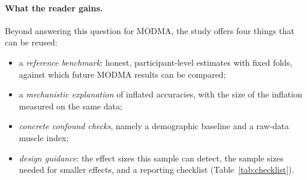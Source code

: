 \paragraph{What the reader gains.} Beyond answering this question for MODMA, the study offers four things that can be
reused:
\begin{itemize}
  \item a \emph{reference benchmark}: honest, participant-level estimates with fixed folds, against which future
        MODMA results can be compared;
  \item a \emph{mechanistic explanation} of inflated accuracies, with the size of the inflation measured on the
        same data;
  \item \emph{concrete confound checks}, namely a demographic baseline and a raw-data muscle index;
  \item \emph{design guidance}: the effect sizes this sample can detect, the sample sizes needed for smaller
        effects, and a reporting checklist (Table~\ref{tab:checklist}).
\end{itemize}

